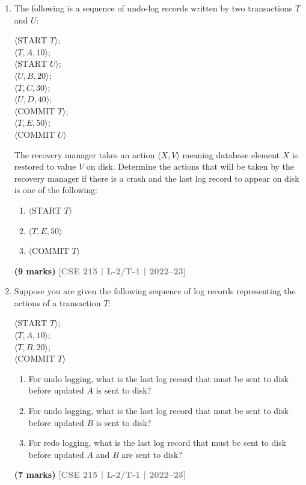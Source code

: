 \documentclass[12pt]{article}
\newcommand{\yr}[1]{\hfill\textcolor{gray}{\small\textbf{[#1]}}}
\newcommand{\mk}[1]{\textcolor{orange!70!black}{\small\textbf{(#1 marks)}}}
\begin{document}
\begin{enumerate}
\item The following is a sequence of undo-log records written by two transactions $T$ and $U$:
\begin{center}
\small\ttfamily
$\langle\text{START } T\rangle$; \\
$\langle T, A, 10\rangle$; \\
$\langle\text{START } U\rangle$;\\ 
$\langle U, B, 20\rangle$; \\
$\langle T, C, 30\rangle$; \\
$\langle U, D, 40\rangle$; \\
$\langle\text{COMMIT } T\rangle$; \\ 
$\langle T, E, 50\rangle$; \\
$\langle\text{COMMIT } U\rangle$
\end{center}
The recovery manager takes an action $\langle X, V\rangle$ meaning database element $X$ is restored to value $V$ on disk. Determine the actions that will be taken by the recovery manager if there is a crash and the last log record to appear on disk is one of the following:
\begin{enumerate}
  \item $\langle\text{START } T\rangle$
  \item $\langle T, E, 50\rangle$
  \item $\langle\text{COMMIT } T\rangle$
\end{enumerate}
  \mk{9} \yr{CSE 215 | L-2/T-1 | 2022--23}


\item Suppose you are given the following sequence of log records representing the actions of a transaction $T$:
\begin{center}
\small\ttfamily
$\langle\text{START } T\rangle$; \\
$\langle T, A, 10\rangle$; \\
$\langle T, B, 20\rangle$; \\
$\langle\text{COMMIT } T\rangle$
\end{center}
\begin{enumerate}
  \item For undo logging, what is the last log record that must be sent to disk before updated $A$ is sent to disk?
  \item For undo logging, what is the last log record that must be sent to disk before updated $B$ is sent to disk?
  \item For redo logging, what is the last log record that must be sent to disk before updated $A$ and $B$ are sent to disk?
\end{enumerate}
\mk{7} \yr{CSE 215 | L-2/T-1 | 2022--23}



\end{enumerate}
\end{document}
